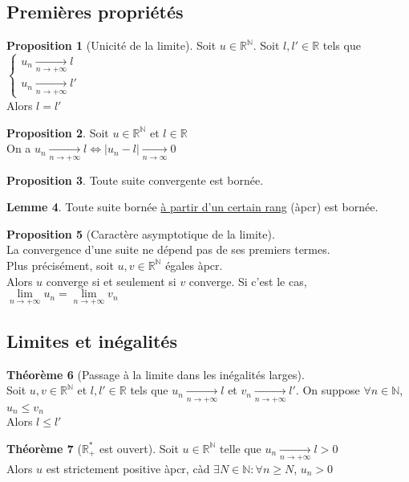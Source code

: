 \documentclass[10pt,a4paper]{article}
\theoremstyle{definition}
\newtheorem{proposition}{Proposition}[section]
\newtheorem{theorem}[proposition]{Théorème}
\newtheorem{lemme}[proposition]{Lemme}
\begin{document}
\subsection{Premières propriétés}
\begin{proposition}[Unicité de la limite]
Soit $u \in \mathbb{R}^\mathbb{N}$. Soit $l, l' \in \mathbb{R}$ tels que $\begin{cases}
u_n \xrightarrow[n \to +\infty]{} l \\ u_n \xrightarrow[n \to +\infty]{} l'
\end{cases}$ \\
Alors $l = l'$
\end{proposition}
\begin{proposition}
Soit $u \in \mathbb{R}^\mathbb{N}$ et $l \in \mathbb{R}$ \\
On a $u_n \xrightarrow[n \to +\infty]{} l \iff |u_n - l| \xrightarrow[n \to \infty]{} 0$
\end{proposition}
\begin{proposition}
Toute suite convergente est bornée.
\end{proposition}
\begin{lemme}
Toute suite bornée \uline{à partir d'un certain rang} (àpcr) est bornée.
\end{lemme}
\begin{proposition}[Caractère asymptotique de la limite]
\hfill \\
La convergence d'une suite ne dépend pas de ses premiers termes. \\
Plus précisément, soit $u, v \in \mathbb{R}^\mathbb{N}$ égales àpcr. \\
Alors $u$ converge si et seulement si $v$ converge. Si c'est le cas, $\lim\limits_{n \to +\infty} u_n = \lim\limits_{n \to +\infty} v_n$
\end{proposition}

\subsection{Limites et inégalités}
\begin{theorem}[Passage à la limite dans les inégalités larges]
\hfill \\
Soit $u, v \in \mathbb{R}^\mathbb{N}$ et $l, l' \in \mathbb{R}$ tels que $u_n \xrightarrow[n \to +\infty]{} l$ et $v_n \xrightarrow[n \to +\infty]{} l'$. On suppose $\forall n \in \mathbb{N}$, $u_n \leq v_n$ \\
Alors $l \leq l'$
\end{theorem}
\begin{theorem}[$\mathbb{R}_+^*$ est ouvert]
Soit $u \in \mathbb{R}^\mathbb{N}$ telle que $u_n \xrightarrow[n \to +\infty]{} l > 0$ \\
Alors $u$ est strictement positive àpcr, càd $\exists N \in \mathbb{N}: \forall n \geq N$, $u_n > 0$
\end{theorem}
\end{document}
